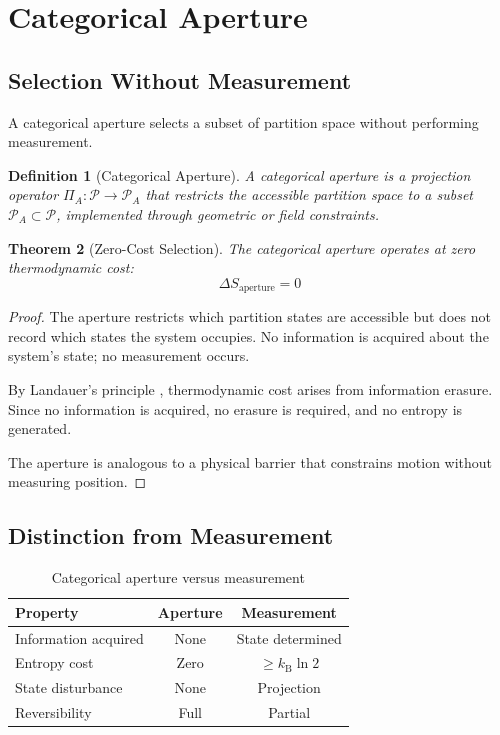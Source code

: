 \documentclass[twocolumn,10pt]{article}
\newtheorem{theorem}{Theorem}[section]
\newtheorem{definition}[theorem]{Definition}
\newcommand{\kB}{k_{\mathrm{B}}}
\begin{document}
\section{Categorical Aperture}
\label{sec:aperture}

\subsection{Selection Without Measurement}

A categorical aperture selects a subset of partition space without performing measurement.

\begin{definition}[Categorical Aperture]
\label{def:aperture}
A categorical aperture is a projection operator $\Pi_A: \mathcal{P} \to \mathcal{P}_A$ that restricts the accessible partition space to a subset $\mathcal{P}_A \subset \mathcal{P}$, implemented through geometric or field constraints.
\end{definition}

\begin{theorem}[Zero-Cost Selection]
\label{thm:zerocost}
The categorical aperture operates at zero thermodynamic cost:
\begin{equation}
    \Delta S_{\mathrm{aperture}} = 0
\end{equation}
\end{theorem}

\begin{proof}
The aperture restricts which partition states are accessible but does not record which states the system occupies. No information is acquired about the system's state; no measurement occurs.

By Landauer's principle \citep{landauer1961}, thermodynamic cost arises from information erasure. Since no information is acquired, no erasure is required, and no entropy is generated.

The aperture is analogous to a physical barrier that constrains motion without measuring position.
\end{proof}

\subsection{Distinction from Measurement}

\begin{table}[h]
\centering
\caption{Categorical aperture versus measurement}
\label{tab:aperture}
\begin{tabular}{lcc}
\toprule
\textbf{Property} & \textbf{Aperture} & \textbf{Measurement} \\
\midrule
Information acquired & None & State determined \\
Entropy cost & Zero & $\geq \kB \ln 2$ \\
State disturbance & None & Projection \\
Reversibility & Full & Partial \\
\bottomrule
\end{tabular}
\end{table}
\end{document}

